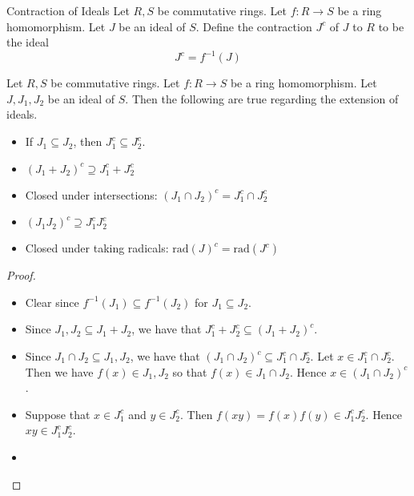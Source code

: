 \documentclass[a4paper]{article}
\begin{document}
\begin{defn}{Contraction of Ideals}{} Let $R,S$ be commutative rings. Let $f:R\to S$ be a ring homomorphism. Let $J$ be an ideal of $S$. Define the contraction $J^c$ of $J$ to $R$ to be the ideal $$J^c=f^{-1}(J)$$
\end{defn}

\begin{prp}{}{} Let $R,S$ be commutative rings. Let $f:R\to S$ be a ring homomorphism. Let $J,J_1,J_2$ be an ideal of $S$. Then the following are true regarding the extension of ideals. 
\begin{itemize}
\item If $J_1\subseteq J_2$, then $J_1^c\subseteq J_2^c$. 
\item $(J_1+J_2)^c\supseteq J_1^c+J_2^c$
\item Closed under intersections: $(J_1\cap J_2)^c=J_1^c\cap J_2^c$
\item $(J_1J_2)^c\supseteq J_1^cJ_2^c$
\item Closed under taking radicals: $\text{rad}(J)^c=\text{rad}(J^c)$
\end{itemize} 
\begin{proof}~\\
\begin{itemize}
\item Clear since $f^{-1}(J_1)\subseteq f^{-1}(J_2)$ for $J_1\subseteq J_2$. 
\item Since $J_1,J_2\subseteq J_1+J_2$, we have that $J_1^c+J_2^c\subseteq(J_1+J_2)^c$. 
\item Since $J_1\cap J_2\subseteq J_1,J_2$, we have that $(J_1\cap J_2)^c\subseteq J_1^c\cap J_2^c$. Let $x\in J_1^c\cap J_2^c$. Then we have $f(x)\in J_1,J_2$ so that $f(x)\in J_1\cap J_2$. Hence $x\in(J_1\cap J_2)^c$. 
\item Suppose that $x\in J_1^c$ and $y\in J_2^c$. Then $f(xy)=f(x)f(y)\in J_1^cJ_2^c$. Hence $xy\in J_1^cJ_2^c$. 
\item 
\end{itemize}
\end{proof}
\end{prp}
\end{document}

